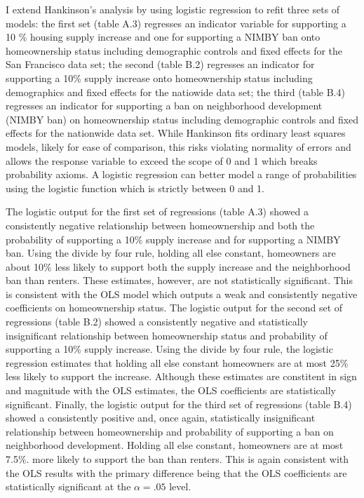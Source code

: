 \documentclass[]{article}
\begin{document}
I extend Hankinson's analysis by using logistic regression to refit three sets of models: the first set (table A.3) regresses an indicator variable for supporting a 10 \% housing supply increase and one for supporting a NIMBY ban onto homeownership status including demographic controls and fixed effects for the San Francisco data set; the second (table B.2) regresses an indicator for supporting a 10\% supply increase onto homeownership status including demographics and fixed effects for the natiowide data set; the third (table B.4) regresses an indicator for supporting a ban on neighborhood development (NIMBY ban) on homeownership status including demographic controls and fixed effects for the nationwide data set. While Hankinson fits ordinary least squares models, likely for ease of comparison, this risks violating normality of errors and allows the response variable to exceed the scope of 0 and 1 which breaks probability axioms. A logistic regression can better model a range of probabilities using the logistic function which is strictly between 0 and 1.

The logistic output for the first set of regressions (table A.3) showed a consistently negative relationship between homeownership and both the probability of supporting a 10\% supply increase and for supporting a NIMBY ban. Using the divide by four rule, holding all else constant, homeowners are about 10\% less likely to support both the supply increase and the neighborhood ban than renters. These estimates, however, are not statistically significant. This is consistent with the OLS model which outputs a weak and consistently negative coefficients on homeownership status. The logistic output for the second set of regressions (table B.2) showed a consistently negative and statistically insignificant relationship between homeownership status and probability of supporting a 10\% supply increase. Using the divide by four rule, the logistic regression estimates that holding all else constant homeowners are at most 25\% less likely to support the increase. Although these estimates are constitent in sign and magnitude with the OLS estimates, the OLS coefficients are statistically significant. Finally, the logistic output for the third set of regressions (table B.4) showed a consistently positive and, once again, statistically insignificant relationship between homeownership and probability of supporting a ban on neighborhood development. Holding all else constant, homeowners are at most 7.5\%. more likely to support the ban than renters. This is again consistent with the OLS results with the primary difference being that the OLS coefficients are statistically significant at the \(\alpha = .05\) level.
\end{document}
